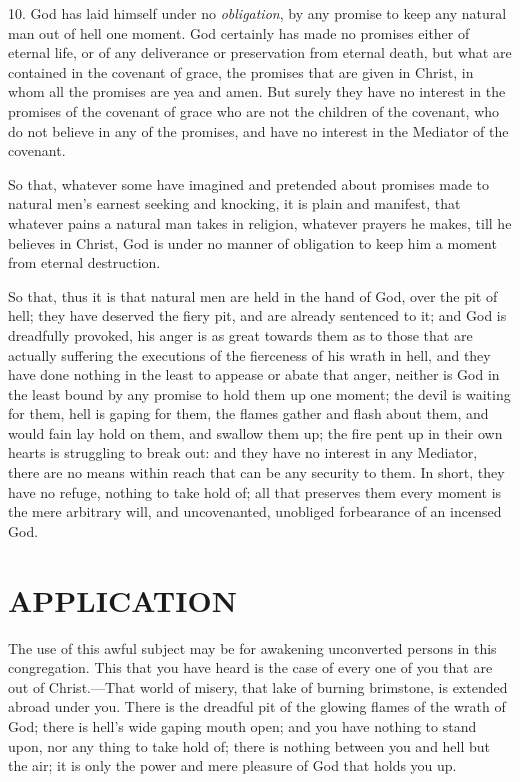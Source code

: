 \documentclass[
]{book}
\begin{document}
10. God has laid himself under no \emph{obligation}, by any promise to keep any natural man out of hell one moment. God certainly has made no promises either of eternal life, or of any deliverance or preservation from eternal death, but what are contained in the covenant of grace, the promises that are given in Christ, in whom all the promises are yea and amen. But surely they have no interest in the promises of the covenant of grace who are not the children of the covenant, who do not believe in any of the promises, and have no interest in the Mediator of the covenant.

So that, whatever some have imagined and pretended about promises made to natural men's earnest seeking and knocking, it is plain and manifest, that whatever pains a natural man takes in religion, whatever prayers he makes, till he believes in Christ, God is under no manner of obligation to keep him a moment from eternal destruction.

So that, thus it is that natural men are held in the hand of God, over the pit of hell; they have deserved the fiery pit, and are already sentenced to it; and God is dreadfully provoked, his anger is as great towards them as to those that are actually suffering the executions of the fierceness of his wrath in hell, and they have done nothing in the least to appease or abate that anger, neither is God in the least bound by any promise to hold them up one moment; the devil is waiting for them, hell is gaping for them, the flames gather and flash about them, and would fain lay hold on them, and swallow them up; the fire pent up in their own hearts is struggling to break out: and they have no interest in any Mediator, there are no means within reach that can be any security to them. In short, they have no refuge, nothing to take hold of; all that preserves them every moment is the mere arbitrary will, and uncovenanted, unobliged forbearance of an incensed God.

\hypertarget{application}{%
\section{APPLICATION}\label{application}}

The use of this awful subject may be for awakening unconverted persons in this congregation. This that you have heard is the case of every one of you that are out of Christ.---That world of misery, that lake of burning brimstone, is extended abroad under you. There is the dreadful pit of the glowing flames of the wrath of God; there is hell's wide gaping mouth open; and you have nothing to stand upon, nor any thing to take hold of; there is nothing between you and hell but the air; it is only the power and mere pleasure of God that holds you up.
\end{document}
